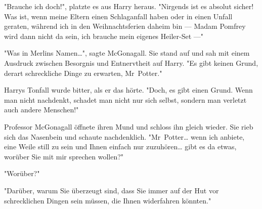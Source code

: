 {"Brauche ich doch!", platzte es aus Harry heraus. "Nirgends ist es absolut sicher! Was ist, wenn meine Eltern einen Schlaganfall haben oder in einen Unfall geraten, während ich in den Weihnachtsferien daheim bin --- Madam Pomfrey wird dann nicht da sein, ich brauche mein eigenes Heiler-Set ---"

"Was in Merlins Namen…", sagte McGonagall. Sie stand auf und sah mit einem Ausdruck zwischen Besorgnis und Entnervtheit auf Harry. "Es gibt keinen Grund, derart schreckliche Dinge zu erwarten, Mr~Potter."

Harrys Tonfall wurde bitter, als er das hörte. "Doch, es gibt einen Grund. Wenn man nicht nachdenkt, schadet man nicht nur sich selbst, sondern man verletzt auch andere Menschen!"

Professor McGonagall öffnete ihren Mund und schloss ihn gleich wieder. Sie rieb sich das Nasenbein und schaute nachdenklich. "Mr~Potter… wenn ich anbiete, eine Weile still zu sein und Ihnen einfach nur zuzuhören… gibt es da etwas, worüber Sie mit mir sprechen wollen?"

"Worüber?"

"Darüber, warum Sie überzeugt sind, dass Sie immer auf der Hut vor schrecklichen Dingen sein müssen, die Ihnen widerfahren könnten."

}
